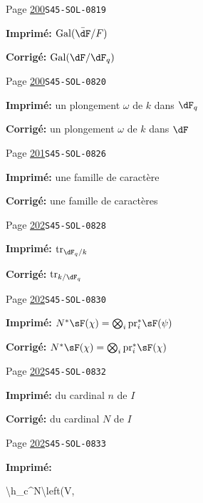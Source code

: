 \documentclass[oneside]{book}
\DeclareMathOperator{\gal}{Gal}
\DeclareMathOperator{\tr}{tr}
\newcommand{\pr}{\mathrm{pr}} %
\theoremstyle{sga-source}
\theoremstyle{sga-source-dash}
\theoremstyle{sga-source-dotdash}
\theoremstyle{sga-source-number-note-dash}
\theoremstyle{sga-source-note-number-dotdash}
\theoremstyle{sga-source-example-dotdash}
\theoremstyle{sga-source-inline-number}
\theoremstyle{sga-source-bare-number}
\theoremstyle{sga-source}
\begin{document}
\begin{description}
\smallskip
\item[\hypertarget{apparatus:FR-0182}{182}] Page \hyperlink{printpage:fr:200}{200}\quad\texttt{S45-SOL-0819}
\par\noindent\textbf{Imprimé:} \(\gal(\bar\dF/F)\)
\par\noindent\textbf{Corrigé:} \(\gal(\dF/\dF_q)\)
\smallskip
\item[\hypertarget{apparatus:FR-0183}{183}] Page \hyperlink{printpage:fr:200}{200}\quad\texttt{S45-SOL-0820}
\par\noindent\textbf{Imprimé:} un plongement $\omega$ de $k$ dans $\dF_q$
\par\noindent\textbf{Corrigé:} un plongement $\omega$ de $k$ dans $\dF$
\smallskip
\item[\hypertarget{apparatus:FR-0184}{184}] Page \hyperlink{printpage:fr:201}{201}\quad\texttt{S45-SOL-0826}
\par\noindent\textbf{Imprimé:} une famille de caractère
\par\noindent\textbf{Corrigé:} une famille de caractères
\smallskip
\item[\hypertarget{apparatus:FR-0185}{185}] Page \hyperlink{printpage:fr:202}{202}\quad\texttt{S45-SOL-0828}
\par\noindent\textbf{Imprimé:} \(\tr_{\dF_q/k}\)
\par\noindent\textbf{Corrigé:} \(\tr_{k/\dF_q}\)
\smallskip
\item[\hypertarget{apparatus:FR-0186}{186}] Page \hyperlink{printpage:fr:202}{202}\quad\texttt{S45-SOL-0830}
\par\noindent\textbf{Imprimé:} \(N^\ast\sF(\chi) = \bigotimes_i \pr_i^\ast\sF(\psi)\)
\par\noindent\textbf{Corrigé:} \(N^\ast\sF(\chi) = \bigotimes_i \pr_i^\ast\sF(\chi)\)
\smallskip
\item[\hypertarget{apparatus:FR-0187}{187}] Page \hyperlink{printpage:fr:202}{202}\quad\texttt{S45-SOL-0832}
\par\noindent\textbf{Imprimé:} du cardinal $n$ de $I$
\par\noindent\textbf{Corrigé:} du cardinal $N$ de $I$
\smallskip
\item[\hypertarget{apparatus:FR-0188}{188}] Page \hyperlink{printpage:fr:202}{202}\quad\texttt{S45-SOL-0833}
\par\noindent\textbf{Imprimé:} {\footnotesize\ttfamily\raggedright \textbackslash{}\allowbreak{}h\_\allowbreak{}c\textasciicircum{}\allowbreak{}N\textbackslash{}\allowbreak{}left(\allowbreak{}V,\allowbreak{}\par}

\end{description}
\end{document}
